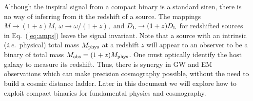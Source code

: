 Although the inspiral signal from a compact binary is a standard
siren, there is no way of inferring from it the redshift of a source.
The mappings $M \rightarrow (1+z) M$, $\omega \rightarrow \omega/(1+z),$
and $D_{\rm L} \rightarrow (1+z) D_{\rm L}$ for redshifted sources in Eq.~(\ref{eq:amps})
leave the signal invariant.  Note that a source with an intrinsic
(\emph{i.e.}\ physical) total mass $M_{\rm phys}$ at a redshift $z$ will
appear to an observer to be a binary of total mass $M_{\rm obs}
=(1+z)M_{\rm phys}$. One must optically identify the host galaxy 
to measure its redshift. Thus, there is
synergy in GW and EM observations which can make precision
cosmography possible, without the need to build a cosmic distance
ladder. Later in this document we will explore how to exploit
compact binaries for fundamental physics and cosmography.



